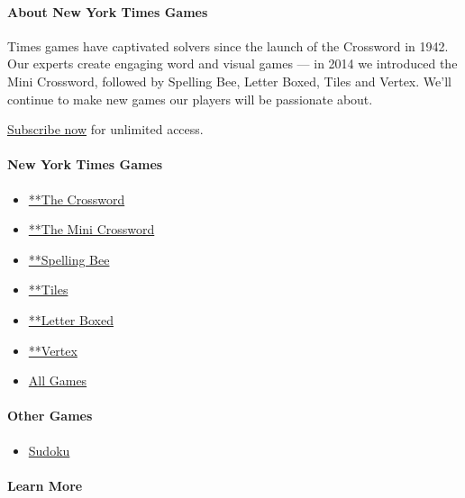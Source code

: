 \hypertarget{about-new-york-times-games}{%
\paragraph{About New York Times
Games}\label{about-new-york-times-games}}

Times games have captivated solvers since the launch of the Crossword in
1942. Our experts create engaging word and visual games --- in 2014 we
introduced the Mini Crossword, followed by Spelling Bee, Letter Boxed,
Tiles and Vertex. We'll continue to make new games our players will be
passionate about.

\href{https://www.nytimes.com/subscription/games?campaignId=9W9LL}{Subscribe
now} for unlimited access.

\hypertarget{new-york-times-games-1}{%
\paragraph{New York Times Games}\label{new-york-times-games-1}}

\begin{itemize}
\tightlist
\item
  \href{/crosswords/game/daily}{**The Crossword}
\item
  \href{/crosswords/game/mini}{**The Mini Crossword}
\item
  \href{/puzzles/spelling-bee}{**Spelling Bee}
\item
  \href{/puzzles/tiles}{**Tiles}
\item
  \href{/puzzles/letter-boxed}{**Letter Boxed}
\item
  \href{/puzzles/vertex}{**Vertex}
\item
  \href{/crosswords}{All Games}
\end{itemize}

\hypertarget{other-games-1}{%
\paragraph{Other Games}\label{other-games-1}}

\begin{itemize}
\tightlist
\item
  \href{/puzzles/sudoku}{Sudoku}
\end{itemize}

\hypertarget{learn-more}{%
\paragraph{Learn More}\label{learn-more}}

